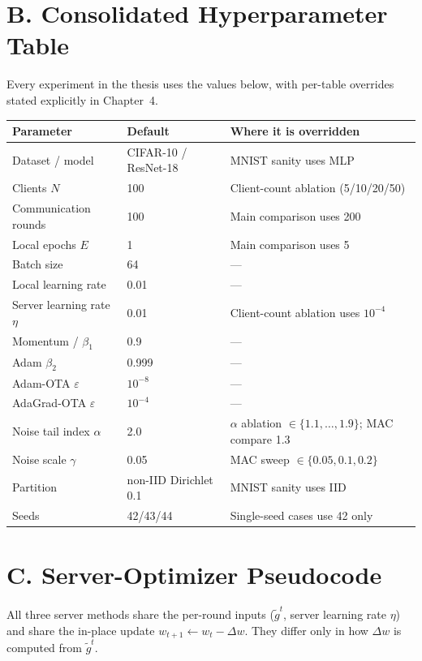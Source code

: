 \section*{B. Consolidated Hyperparameter Table}
Every experiment in the thesis uses the values below, with per-table
overrides stated explicitly in Chapter~4.

\begin{center}
\begin{tabular}{l|l|l}
\hline
Parameter & Default & Where it is overridden \\
\hline
Dataset / model        & CIFAR-10 / ResNet-18 & MNIST sanity uses MLP \\
Clients $N$            & 100        & Client-count ablation (5/10/20/50) \\
Communication rounds   & 100        & Main comparison uses 200 \\
Local epochs $E$       & 1          & Main comparison uses 5 \\
Batch size             & 64         & --- \\
Local learning rate    & 0.01       & --- \\
Server learning rate $\eta$ & 0.01  & Client-count ablation uses $10^{-4}$ \\
Momentum / $\beta_1$   & 0.9        & --- \\
Adam $\beta_2$         & 0.999      & --- \\
Adam-OTA $\varepsilon$ & $10^{-8}$  & --- \\
AdaGrad-OTA $\varepsilon$ & $10^{-4}$ & --- \\
Noise tail index $\alpha$ & 2.0     & $\alpha$ ablation $\in\{1.1,\dots,1.9\}$; MAC compare 1.3 \\
Noise scale $\gamma$   & 0.05       & MAC sweep $\in\{0.05,0.1,0.2\}$ \\
Partition              & non-IID Dirichlet 0.1 & MNIST sanity uses IID \\
Seeds                  & 42/43/44   & Single-seed cases use 42 only \\
\hline
\end{tabular}
\end{center}

\section*{C. Server-Optimizer Pseudocode}
All three server methods share the per-round inputs ($\tilde g^t$,
server learning rate $\eta$) and share the in-place update
$w_{t+1}\leftarrow w_t - \Delta w$. They differ only in how $\Delta w$
is computed from $\tilde g^t$.

